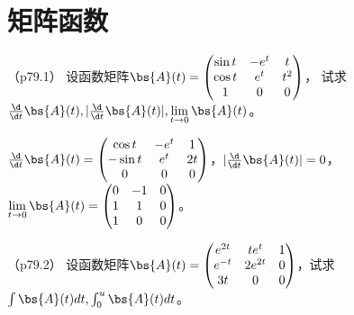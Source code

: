 \documentclass[12pt, a4paper, oneside, UTF8]{ctexbook}
\begin{document}
\else
\fi

\chapter{矩阵函数}
\begin{question}（p79.1）
设函数矩阵$\bs{A}(t)=\begin{pmatrix}
    \sin t &-e^t & t \\
    \cos t & e^t & t^2 \\
    1 & 0 & 0
\end{pmatrix}$，
试求$\frac{\d }{\d t} \bs{A}(t),|\frac{\d }{\d t} \bs{A}(t)|,\lim\limits_{t \to 0} \bs{A}(t)$。
\end{question}

\begin{solution}
    $\frac{\d }{\d t} \bs{A}(t)=\begin{pmatrix}
    \cos t &-e^t & 1 \\
    -\sin t & e^t & 2t \\
    0 & 0 & 0
    \end{pmatrix}$，$|\frac{\d }{\d t} \bs{A}(t)|=0$，
    $\lim\limits_{t \to 0} \bs{A}(t)=\begin{pmatrix}
        0 &-1 & 0 \\
        1 & 1 & 0 \\
        1 & 0 & 0
    \end{pmatrix}$。

\end{solution}

\begin{question}（p79.2）
    设函数矩阵$\bs{A}(t)=\begin{pmatrix}
        e^{2t}& te^t & 1\\
        e^{-t} & 2e^{2t} & 0\\
        3t & 0 & 0
    \end{pmatrix}$，试求$\int \bs{A}(t) dt,\int_{0}^u \bs{A}(t)dt$。
\end{question}
\end{document}

